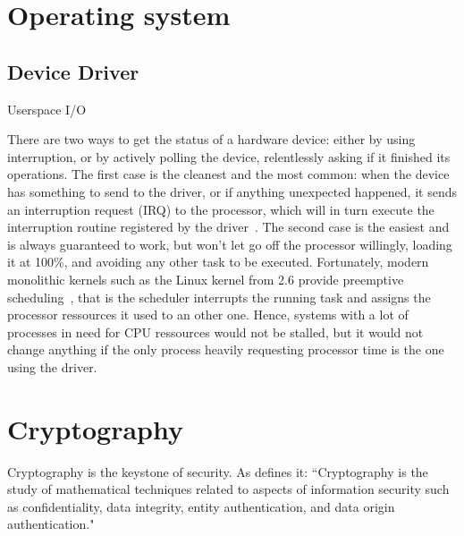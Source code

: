 \section{Operating system}



\subsection{Device Driver}\label{sec:theory-driver}
Userspace I/O~\cite{koch2011}

There are two ways to get the status of a hardware device: either by using interruption, or by actively polling the device, relentlessly asking if it finished its operations.
The first case is the cleanest and the most common: when the device has something to send to the driver, or if anything unexpected happened, it sends an interruption request (IRQ) to the processor, which will in turn execute the interruption routine registered by the driver~\citep[chap. 10]{Corbet:2005:LDD:1209083}.
The second case is the easiest and is always guaranteed to work, but won't let go off the processor willingly, loading it at 100\%, and avoiding any other task to be executed.
Fortunately, modern monolithic kernels such as the Linux kernel from 2.6 provide preemptive scheduling~\cite{Santhanam2003}, that is the scheduler interrupts the running task and assigns the processor ressources it used to an other one.
Hence, systems with a lot of processes in need for CPU ressources would not be stalled, but it would not change anything if the only process heavily requesting processor time is the one using the driver.




\section{Cryptography}

Cryptography is the keystone of security. As \citet{Menezes1996} defines it: ``Cryptography is the study of mathematical techniques related to aspects of information security such as confidentiality, data integrity, entity authentication, and data origin authentication."

